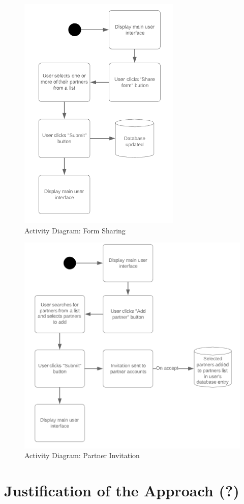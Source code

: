 \begin{figure}[]
\center
\includegraphics{../figures/ActivityDiagramFormSharing}
\caption{Activity Diagram: Form Sharing}
\end{figure}

\begin{figure}[]
\center
\includegraphics{../figures/ActivityDiagramPartnerInvitation}
\caption{Activity Diagram: Partner Invitation}
\end{figure}

\section{Justification of the Approach (?)}